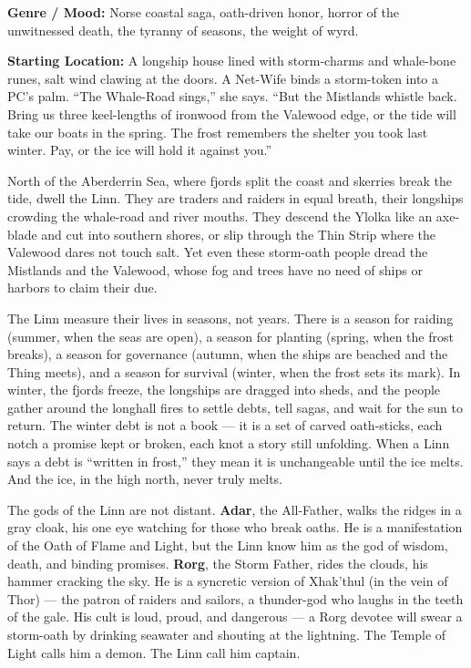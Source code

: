 \textbf{Genre / Mood:} Norse coastal saga, oath-driven honor, horror of the unwitnessed death, the tyranny of seasons, the weight of wyrd.

\textbf{Starting Location:} A longship house lined with storm-charms and whale-bone runes, salt wind clawing at the doors. A Net-Wife binds a storm-token into a PC's palm. ``The Whale-Road sings,'' she says. ``But the Mistlands whistle back. Bring us three keel-lengths of ironwood from the Valewood edge, or the tide will take our boats in the spring. The frost remembers the shelter you took last winter. Pay, or the ice will hold it against you.''

North of the Aberderrin Sea, where fjords split the coast and skerries break the tide, dwell the Linn. They are traders and raiders in equal breath, their longships crowding the whale-road and river mouths. They descend the Ylolka like an axe-blade and cut into southern shores, or slip through the Thin Strip where the Valewood dares not touch salt. Yet even these storm-oath people dread the Mistlands and the Valewood, whose fog and trees have no need of ships or harbors to claim their due.

The Linn measure their lives in seasons, not years. There is a season for raiding (summer, when the seas are open), a season for planting (spring, when the frost breaks), a season for governance (autumn, when the ships are beached and the Thing meets), and a season for survival (winter, when the frost sets its mark). In winter, the fjords freeze, the longships are dragged into sheds, and the people gather around the longhall fires to settle debts, tell sagas, and wait for the sun to return. The winter debt is not a book --- it is a set of carved oath-sticks, each notch a promise kept or broken, each knot a story still unfolding. When a Linn says a debt is ``written in frost,'' they mean it is unchangeable until the ice melts. And the ice, in the high north, never truly melts.

The gods of the Linn are not distant. \textbf{Adar}, the All-Father, walks the ridges in a gray cloak, his one eye watching for those who break oaths. He is a manifestation of the Oath of Flame and Light, but the Linn know him as the god of wisdom, death, and binding promises. \textbf{Rorg}, the Storm Father, rides the clouds, his hammer cracking the sky. He is a syncretic version of Xhak'thul (in the vein of Thor) --- the patron of raiders and sailors, a thunder-god who laughs in the teeth of the gale. His cult is loud, proud, and dangerous --- a Rorg devotee will swear a storm-oath by drinking seawater and shouting at the lightning. The Temple of Light calls him a demon. The Linn call him captain.

